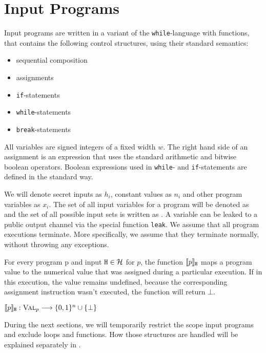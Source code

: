 \section{Input Programs}\label{sec:inputLang}

Input programs are written in a variant of the \texttt{while}-language with functions, that contains the following control structures, using their standard semantics:
\begin{itemize}
    \setlength\itemsep{0em}
    \item sequential composition
    \item assignments
    \item \texttt{if}-statements
    \item \texttt{while}-statements
    \item \texttt{break}-statements
\end{itemize}
All variables are signed integers of a fixed width $w$. The right hand side of an assignment is an expression that uses the standard arithmetic and bitwise boolean operators. Boolean expressions used in \texttt{while}- and \texttt{if}-statements are defined in the standard way.

We will denote secret inputs as $h_i$, constant values as $n_i$ and other program variables as $x_i$. The set of all input variables for a program will be denoted as \In and the set of all possible input sets is written as \allIn. A variable can be leaked to a public output channel via the special function \texttt{leak}. We assume that all program executions terminate. More specifically, we assume that they terminate normally, without throwing any exceptions.

\begin{definition}
For every program p and input $\mathtt{H} \in \mathcal{H}$ for $p$, the function $\llbracket p \rrbracket_{\mathtt{H}}$ maps a program value to the numerical value that was assigned during a particular execution. If in this execution, the value remains undefined, because the corresponding assignment instruction wasn't executed, the function will return $\bot$.
    \begin{center}
        $\llbracket p \rrbracket_{\mathtt{H}}: \textsc{Val}_p \longrightarrow \{0, 1\}^n \cup \{\bot\}$
    \end{center}
\end{definition}

During the next sections, we will temporarily restrict the scope input programs and exclude loops and functions. How those structures are handled will be explained separately in .

